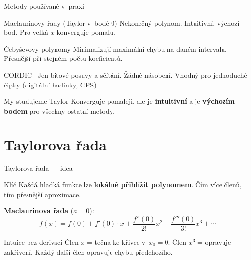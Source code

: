 \documentclass[12pt]{beamer}
\begin{document}
\begin{frame}{Metody používané v~praxi}

    \begin{block}{Maclaurinovy řady (Taylor v~bodě 0)}
        Nekonečný polynom. Intuitivní, výchozí bod.
        Pro velká $x$ konverguje pomalu.
    \end{block}

    \pause

    \begin{exampleblock}{Čebyševovy polynomy}
        Minimalizují maximální chybu na daném intervalu.
        Přesnější při stejném počtu koeficientů.
    \end{exampleblock}

    \pause

    \begin{block}{CORDIC~\cite{volder1959}}
        Jen bitové posuvy a sčítání. Žádné násobení.
        Vhodný pro jednoduché čipky (digitální hodinky, GPS).
    \end{block}

    \pause

    \begin{alertblock}{My studujeme Taylor}
        Konverguje pomaleji, ale je \textbf{intuitivní}
        a je \textbf{výchozím bodem} pro všechny ostatní metody.
    \end{alertblock}

\end{frame}

\section{Taylorova řada}

\begin{frame}{Taylorova řada --- idea}

    \begin{block}{Klíč}
        Každá hladká funkce lze \textbf{lokálně přiblížit polynomem}.
        Čím více členů, tím přesnější aproximace.
    \end{block}

    \pause
    \bigskip

    \textbf{Maclaurinova řada} ($a = 0$):
    \[
        f(x) = f(0) + f'(0)\cdot x
               + \frac{f''(0)}{2!} x^2
               + \frac{f'''(0)}{3!} x^3 + \cdots
    \]

    \pause
    \begin{exampleblock}{Intuice bez derivací}
        Člen $x$ = tečna ke křivce v~$x_0 = 0$.
        Člen $x^3$ = opravuje zakřivení.
        Každý další člen opravuje chybu předchozího.
    \end{exampleblock}

\end{frame}
\end{document}
